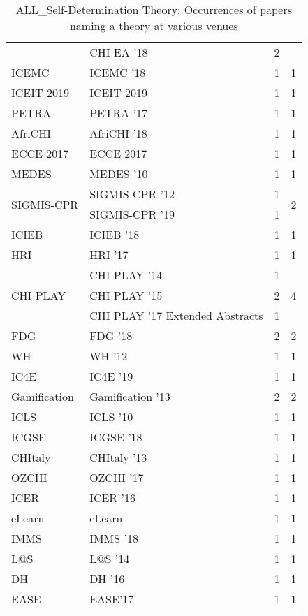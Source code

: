 \begin{table*}[t]
\begin{tabular}{llrr}
& CHI EA '18 & 2 &\\
\multirow{1}{*}{ICEMC } & ICEMC '18 & 1 & \multirow{1}{*}{1}\\
\multirow{1}{*}{ICEIT 2019} & ICEIT 2019 & 1 & \multirow{1}{*}{1}\\
\multirow{1}{*}{PETRA } & PETRA '17 & 1 & \multirow{1}{*}{1}\\
\multirow{1}{*}{AfriCHI } & AfriCHI '18 & 1 & \multirow{1}{*}{1}\\
\multirow{1}{*}{ECCE 2017} & ECCE 2017 & 1 & \multirow{1}{*}{1}\\
\multirow{1}{*}{MEDES } & MEDES '10 & 1 & \multirow{1}{*}{1}\\
\multirow{2}{*}{SIGMIS-CPR } & SIGMIS-CPR '12 & 1 & \multirow{2}{*}{2}\\
& SIGMIS-CPR '19 & 1 &\\
\multirow{1}{*}{ICIEB } & ICIEB '18 & 1 & \multirow{1}{*}{1}\\
\multirow{1}{*}{HRI } & HRI '17 & 1 & \multirow{1}{*}{1}\\
\multirow{3}{*}{CHI PLAY } & CHI PLAY '14 & 1 & \multirow{3}{*}{4}\\
& CHI PLAY '15 & 2 &\\
& CHI PLAY '17 Extended Abstracts & 1 &\\
\multirow{1}{*}{FDG } & FDG '18 & 2 & \multirow{1}{*}{2}\\
\multirow{1}{*}{WH } & WH '12 & 1 & \multirow{1}{*}{1}\\
\multirow{1}{*}{IC4E } & IC4E '19 & 1 & \multirow{1}{*}{1}\\
\multirow{1}{*}{Gamification } & Gamification '13 & 2 & \multirow{1}{*}{2}\\
\multirow{1}{*}{ICLS } & ICLS '10 & 1 & \multirow{1}{*}{1}\\
\multirow{1}{*}{ICGSE } & ICGSE '18 & 1 & \multirow{1}{*}{1}\\
\multirow{1}{*}{CHItaly } & CHItaly '13 & 1 & \multirow{1}{*}{1}\\
\multirow{1}{*}{OZCHI } & OZCHI '17 & 1 & \multirow{1}{*}{1}\\
\multirow{1}{*}{ICER } & ICER '16 & 1 & \multirow{1}{*}{1}\\
\multirow{1}{*}{eLearn} & eLearn & 1 & \multirow{1}{*}{1}\\
\multirow{1}{*}{IMMS } & IMMS '18 & 1 & \multirow{1}{*}{1}\\
\multirow{1}{*}{L@S } & L@S '14 & 1 & \multirow{1}{*}{1}\\
\multirow{1}{*}{DH } & DH '16 & 1 & \multirow{1}{*}{1}\\
\multirow{1}{*}{EASE} & EASE'17 & 1 & \multirow{1}{*}{1}\\
\end{tabular}
\caption{ALL\_Self-Determination Theory: Occurrences of papers naming a theory at various venues}
\end{table*}